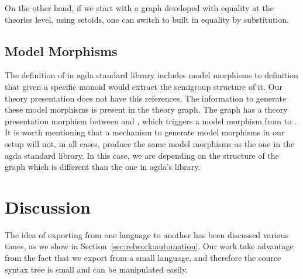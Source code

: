 On the other hand, if we start with a graph developed with equality at the theories level, using setoids, one can switch to built in equality by substitution. 





\subsection{Model Morphisms} 
\label{subsec:model-morph}
\label{subsec:agda:modelMorphisms}
The definition of  in agda standard library includes model morphisms to   definition that given a specific monoid would extract the semigroup structure of it. Our theory presentation does not have this references. The information to generate these model morphisms is present in the theory graph. The graph has a theory presentation morphism between  and , which triggers a model morphism from  to . It is worth mentioning that a mechanism to generate model morphisms in our setup will not, in all cases, produce the same model morphisms as the one in the agda standard library. In this case, we are depending on the structure of the graph which is different than the one in agda's library. 


\section{Discussion}
\label{sec:exporting:discussion}
The idea of exporting from one language to another has been discussed various times, as we show in Section~\ref{sec:relwork:automation}. Our work take advantage from the fact that we export from a small language, and therefore the source syntax tree is small and can be manipulated easily.  

